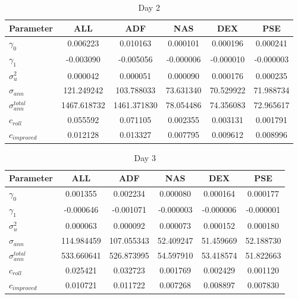 \documentclass{article}
\begin{document}
\begin{table}[H]
\begin{adjustbox}{width=\textwidth}
\begin{tabular}{lccccc}
\toprule
\textbf{Parameter} & \textbf{ALL} & \textbf{ADF} & \textbf{NAS} & \textbf{DEX} & \textbf{PSE} \\
\midrule
\texttt{$\gamma_0$}       & 0.006223  & 0.010163  & 0.000101  & 0.000196  & 0.000241  \\
\texttt{$\gamma_1$}       & -0.003090 & -0.005056 & -0.000006 & -0.000010 & -0.000003 \\
\texttt{$\sigma^2_u$}        & 0.000042  & 0.000051  & 0.000090  & 0.000176  & 0.000235  \\
\texttt{$\sigma_{ann}$}      & 121.249242 & 103.788033 & 73.631340 & 70.529922 & 71.988734 \\
\texttt{$\sigma_{ann}^{total}$}& 1467.618732 & 1461.371830 & 78.054486 & 74.356083 & 72.965617 \\
\texttt{$c_{roll}$}      & 0.055592 &	0.071105 &	0.002355 &	0.003131 &	0.001791  \\
\texttt{$c_{improved}$}      & 0.012128  & 0.013327  & 0.007795  & 0.009612  & 0.008996  \\
\bottomrule
\end{tabular}
\end{adjustbox}
\caption{Day 2}
\label{tab:day2_parameters}
\end{table}

\begin{table}[H]
\begin{adjustbox}{width=\textwidth}
\begin{tabular}{lccccc}
\toprule
\textbf{Parameter} & \textbf{ALL} & \textbf{ADF} & \textbf{NAS} & \textbf{DEX} & \textbf{PSE} \\
\midrule
\texttt{$\gamma_0$}       & 0.001355  & 0.002234  & 0.000080  & 0.000164  & 0.000177  \\
\texttt{$\gamma_1$}       & -0.000646 & -0.001071 & -0.000003 & -0.000006 & -0.000001  \\
\texttt{$\sigma^2_u$}        & 0.000063  & 0.000092  & 0.000073  & 0.000152  & 0.000180  \\
\texttt{$\sigma_{ann}$}      & 114.984459 & 107.055343 & 52.409247 & 51.459669 & 52.188730 \\
\texttt{$\sigma_{ann}^{total}$}& 533.660641 & 526.873995 & 54.597910 & 53.418574 & 51.822663 \\
\texttt{$c_{roll}$}      & 0.025421	& 0.032723 &	0.001769 &	0.002429 &	0.001120  \\
\texttt{$c_{improved}$}      & 0.010721  & 0.011722  & 0.007268  & 0.008897  & 0.007830  \\
\bottomrule
\end{tabular}
\end{adjustbox}
\caption{Day 3}
\label{tab:day3_parameters}
\end{table}
\end{document}
